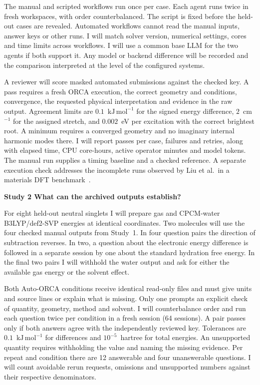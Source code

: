 \documentclass[12pt,a4paper]{article}
\newcommand{\subhead}[1]{\par\addvspace{0.4em}\textbf{#1}\par\nobreak}
\newcommand{\unitE}{\ensuremath{\mathrm{kJ\,mol^{-1}}}}
\begin{document}
The manual and scripted workflows run once per case. Each agent runs twice in
fresh workspaces, with order counterbalanced. The script is fixed before the
held-out cases are revealed. Automated workflows cannot read the manual inputs,
answer keys or other runs. I will match solver version, numerical settings,
cores and time limits across workflows. I will use a common base LLM for the
two agents if both support it. Any model or backend difference will be recorded
and the comparison interpreted at the level of the configured systems.

A reviewer will score masked automated submissions against the checked key.
A pass requires a fresh ORCA execution, the correct geometry and conditions,
convergence, the requested physical interpretation and evidence in the raw output.
Agreement limits are $0.1$~\unitE{} for the signed energy difference,
$2$~cm$^{-1}$ for the assigned stretch, and $0.002$~eV per excitation with the
correct brightest root. A minimum requires a converged geometry and no
imaginary internal harmonic modes there. I will report passes per case, failures and retries, along with
elapsed time, CPU core-hours, active operator minutes and model tokens. The manual
run supplies a timing baseline and a checked reference. A separate execution
check addresses the incomplete runs observed by Liu et al.\ in a materials
DFT benchmark~\cite{dftbench}.

\clearpage
\subhead{Study 2 \enspace What can the archived outputs establish?}
For eight held-out neutral singlets I will prepare gas and CPCM-water
B3LYP/def2-SVP energies at identical coordinates. Two molecules will use the
four checked manual outputs from Study~1. In four question pairs the direction
of subtraction reverses. In two, a question about the electronic energy
difference is followed in a separate session by one about the standard
hydration free energy. In the final two pairs I will withhold the water output
and ask for either the available gas energy or the solvent effect.

Both Auto-ORCA conditions receive identical read-only files and must give
units and source lines or explain what is missing. Only one prompts an explicit
check of quantity, geometry, method and solvent. I will counterbalance order and
run each question twice per condition in a fresh session (64 sessions).
A pair passes only if both answers agree with the independently reviewed key.
Tolerances are $0.1$~\unitE{} for differences and $10^{-5}$~hartree for total
energies. An unsupported quantity requires withholding the value and naming
the missing evidence. Per repeat and condition there are 12 answerable and
four unanswerable questions. I will count avoidable rerun requests, omissions
and unsupported numbers against their respective denominators.
\end{document}
